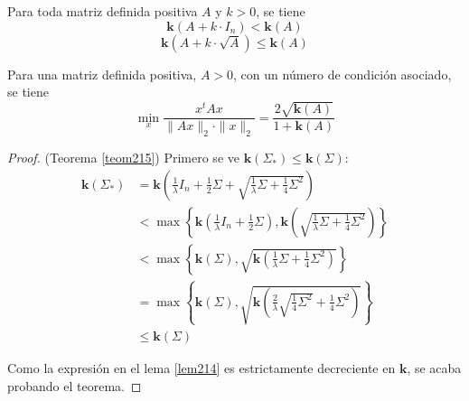 \begin{itemize}
\begin{lema}
Para toda matriz definida positiva $A$ y $k>0$, se tiene
$$\mathbf{k}(A + k \cdot I_n) < \mathbf{k}(A)$$
$$\mathbf{k}(A + k \cdot \sqrt{A}) \leq \mathbf{k}(A)$$
\end{lema}

\begin{lema} \label{lem214}
Para una matriz definida positiva, $A>0$, con un número de condición asociado, se tiene
$$\min_{x} \frac{x^{t} A x}{\|A x \|_2 \cdot \|x \|_2} = \frac{2 \sqrt{\mathbf{k}(A)}}{1+\mathbf{k}(A)}$$
\end{lema}

\begin{proof} (Teorema \ref{teom215})
Primero se ve $\mathbf{k}(\Sigma_*) \leq \mathbf{k}(\Sigma)$:
\begin{align*}
\mathbf{k}(\Sigma_*) &= \mathbf{k} \left( \frac{1}{\lambda} I_n + \frac{1}{2} \Sigma + \sqrt{\frac{1}{\lambda} \Sigma + \frac{1}{4} \Sigma^2} \right) \\
&< \max \left\{ \mathbf{k} \left( \frac{1}{\lambda} I_n + \frac{1}{2} \Sigma \right), \mathbf{k} \left( \sqrt{\frac{1}{\lambda} \Sigma + \frac{1}{4} \Sigma^2} \right) \right\} \\
&< \max \left\{ \mathbf{k}(\Sigma),\sqrt{\mathbf{k} \left( \frac{1}{\lambda} \Sigma + \frac{1}{4} \Sigma^2 \right)} \right\} \\
&= \max \left\{ \mathbf{k}(\Sigma) ,\sqrt{\mathbf{k} \left( \frac{2}{\lambda} \sqrt{\frac{1}{4} \Sigma^2} + \frac{1}{4} \Sigma^2 \right)} \right\} \\
&\leq \mathbf{k}(\Sigma)
\end{align*}

Como la expresión en el lema \ref{lem214} es estrictamente decreciente en $\mathbf{k}$, se acaba probando el teorema.

\end{proof}

\end{itemize}

\newpage
